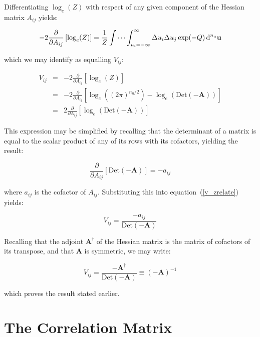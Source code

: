 \documentclass[a4paper,onecolumn,11pt]{book}
\begin{document}
Differentiating $\log_e(Z)$ with respect of any given component of the Hessian
matrix $A_{ij}$ yields:

\begin{equation}
-2 \frac{\partial}{\partial A_{ij}} \left[ \log_e(Z) \right] = \frac{1}{Z}
\idotsint_{u_i=-\infty}^{\infty} \Delta u_i \Delta u_j \exp(-Q) \,\mathrm{d}^{n_\mathrm{u}}\mathbf{u}
\end{equation}

\noindent which we may identify as equalling $V_{ij}$:

\begin{eqnarray}
\label{v_zrelate}
V_{ij} & = & -2 \frac{\partial}{\partial A_{ij}} \left[ \log_e(Z) \right] \\
& = & -2 \frac{\partial}{\partial A_{ij}} \left[ \log_e((2\pi)^{n_\mathrm{u}/2}) - \log_e(\mathrm{Det}(\mathbf{-A})) \right] \nonumber \\
& = & 2 \frac{\partial}{\partial A_{ij}} \left[ \log_e(\mathrm{Det}(\mathbf{-A})) \right] \nonumber
\end{eqnarray}

\noindent This expression may be simplified by recalling that the determinant
of a matrix is equal to the scalar product of any of its rows with its
cofactors, yielding the result:

\begin{equation}
\frac{\partial}{\partial A_{ij}} \left[\mathrm{Det}(\mathbf{-A})\right] = -a_{ij}
\end{equation}

\noindent where $a_{ij}$ is the cofactor of $A_{ij}$. Substituting this into
equation~(\ref{v_zrelate}) yields:

\begin{equation}
V_{ij} = \frac{-a_{ij}}{\mathrm{Det}(\mathbf{-A})}
\end{equation}

Recalling that the adjoint $\mathbf{A}^\dagger$ of the Hessian matrix is the
matrix of cofactors of its transpose, and that $\mathbf{A}$ is symmetric, we
may write:

\begin{equation}
V_{ij} = \frac{-\mathbf{A}^\dagger}{\mathrm{Det}(\mathbf{-A})} \equiv (-\mathbf{A})^{-1}
\end{equation}

\noindent which proves the result stated earlier.

\section{The Correlation Matrix}
\label{correlation_matrix}
\end{document}
